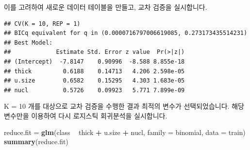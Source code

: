 \documentclass[12pt,]{book}
\newenvironment{Shaded}{\begin{snugshade}}{\end{snugshade}}
\newcommand{\DataTypeTok}[1]{\textcolor[rgb]{0.13,0.29,0.53}{#1}}
\newcommand{\DecValTok}[1]{\textcolor[rgb]{0.00,0.00,0.81}{#1}}
\newcommand{\KeywordTok}[1]{\textcolor[rgb]{0.13,0.29,0.53}{\textbf{#1}}}
\newcommand{\NormalTok}[1]{#1}
\newcommand{\OperatorTok}[1]{\textcolor[rgb]{0.81,0.36,0.00}{\textbf{#1}}}
\newcommand{\StringTok}[1]{\textcolor[rgb]{0.31,0.60,0.02}{#1}}
\begin{document}
이를 고려하여 새로운 데이터 테이블을 만들고, 교차 검증을 실시합니다.

\begin{Shaded}
\end{Shaded}

\begin{verbatim}
## CV(K = 10, REP = 1)
## BICq equivalent for q in (0.0000716797006619085, 0.273173435514231)
## Best Model:
##             Estimate Std. Error z value  Pr(>|z|)
## (Intercept)  -7.8147    0.90996  -8.588 8.855e-18
## thick         0.6188    0.14713   4.206 2.598e-05
## u.size        0.6582    0.15295   4.303 1.683e-05
## nucl          0.5726    0.09923   5.771 7.899e-09
\end{verbatim}

K = 10 개를 대상으로 교차 검증을 수행한 결과 최적의 변수가 선택되었습니다. 해당 변수만을 이용하여 다시 로지스틱 회귀분석을 실시합니다.

\begin{Shaded}
\begin{Highlighting}[]
\NormalTok{reduce.fit =}\StringTok{ }\KeywordTok{glm}\NormalTok{(class }\OperatorTok{~}\StringTok{ }\NormalTok{thick }\OperatorTok{+}\StringTok{ }\NormalTok{u.size }\OperatorTok{+}\StringTok{ }\NormalTok{nucl, }\DataTypeTok{family =}\NormalTok{ binomial,}
                 \DataTypeTok{data =}\NormalTok{ train)}
\KeywordTok{summary}\NormalTok{(reduce.fit)}
\end{Highlighting}
\end{Shaded}
\end{document}
